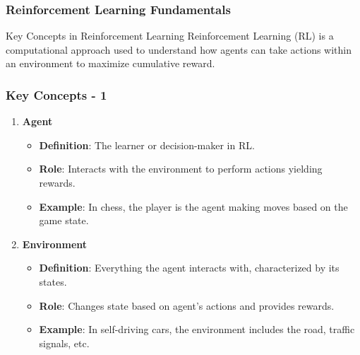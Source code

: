 \documentclass{beamer}
\begin{document}
\begin{frame}[fragile]
    \frametitle{Reinforcement Learning Fundamentals}
    \begin{block}{Key Concepts in Reinforcement Learning}
        Reinforcement Learning (RL) is a computational approach used to understand how agents can take actions within an environment to maximize cumulative reward. 
    \end{block}
\end{frame}

\begin{frame}[fragile]
    \frametitle{Key Concepts - 1}
    \begin{enumerate}
        \item \textbf{Agent}
        \begin{itemize}
            \item \textbf{Definition}: The learner or decision-maker in RL.
            \item \textbf{Role}: Interacts with the environment to perform actions yielding rewards.
            \item \textbf{Example}: In chess, the player is the agent making moves based on the game state.
        \end{itemize}
        
        \item \textbf{Environment}
        \begin{itemize}
            \item \textbf{Definition}: Everything the agent interacts with, characterized by its states.
            \item \textbf{Role}: Changes state based on agent's actions and provides rewards.
            \item \textbf{Example}: In self-driving cars, the environment includes the road, traffic signals, etc.
        \end{itemize}
    \end{enumerate}
\end{frame}
\end{document}
